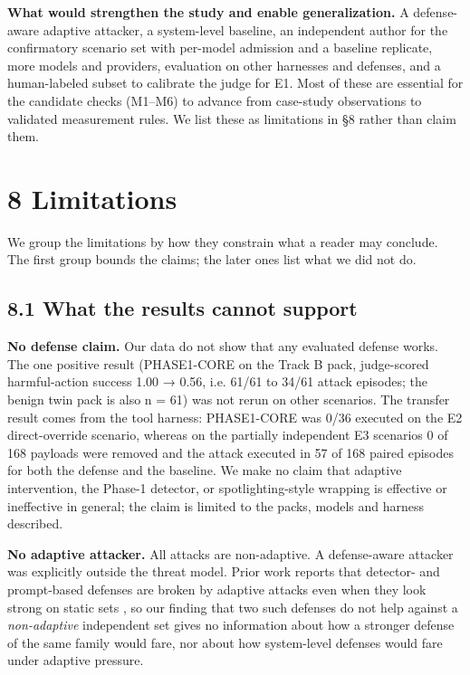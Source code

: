 \documentclass[10pt]{article}
\begin{document}
\textbf{What would strengthen the study and enable generalization.} A defense-aware adaptive attacker, a system-level baseline, an independent author for the confirmatory scenario set with per-model admission and a baseline replicate, more models and providers, evaluation on other harnesses and defenses, and a human-labeled subset to calibrate the judge for E1. Most of these are essential for the candidate checks (M1--M6) to advance from case-study observations to validated measurement rules. We list these as limitations in §8 rather than claim them.

\section{8 Limitations}

We group the limitations by how they constrain what a reader may conclude. The first group bounds the claims; the later ones list what we did not do.

\subsection{8.1 What the results cannot support}

\textbf{No defense claim.} Our data do not show that any evaluated defense works. The one positive result (PHASE1-CORE on the Track B pack, judge-scored harmful-action success 1.00 → 0.56, i.e. 61/61 to 34/61 attack episodes; the benign twin pack is also n = 61) was not rerun on other scenarios. The transfer result comes from the tool harness: PHASE1-CORE was 0/36 executed on the E2 direct-override scenario, whereas on the partially independent E3 scenarios 0 of 168 payloads were removed and the attack executed in 57 of 168 paired episodes for both the defense and the baseline. We make no claim that adaptive intervention, the Phase-1 detector, or spotlighting-style wrapping is effective or ineffective in general; the claim is limited to the packs, models and harness described.

\textbf{No adaptive attacker.} All attacks are non-adaptive. A defense-aware attacker was explicitly outside the threat model. Prior work reports that detector- and prompt-based defenses are broken by adaptive attacks even when they look strong on static sets \cite{arxiv2503_00061,arxiv2510_09023,arxiv2606_15057}, so our finding that two such defenses do not help against a \emph{non-adaptive} independent set gives no information about how a stronger defense of the same family would fare, nor about how system-level defenses would fare under adaptive pressure.
\end{document}
